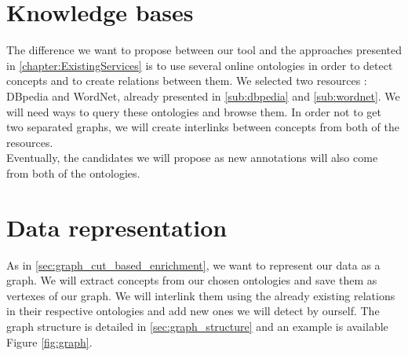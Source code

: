 \section{Knowledge bases} %
\label{sec:knowledge_bases}
The difference we want to propose between our tool and the approaches presented in \ref{chapter:ExistingServices} is to use several online ontologies in order to detect concepts and to create relations between them. We selected two resources : DBpedia and WordNet, already presented in \ref{sub:dbpedia} and \ref{sub:wordnet}. We will need ways to query these ontologies and browse them. In order not to get two separated graphs, we will create interlinks between concepts from both of the resources.\\
Eventually, the candidates we will propose as new annotations will also come from both of the ontologies. 

\section{Data representation} %
\label{sec:data_representation}
As in \ref{sec:graph_cut_based_enrichment}, we want to represent our data as a graph. We will extract concepts from our chosen ontologies and save them as vertexes of our graph. We will interlink them using the already existing relations in their respective ontologies and add new ones we will detect by ourself. The graph structure is detailed in \ref{sec:graph_structure} and an example is available Figure \ref{fig:graph}.
